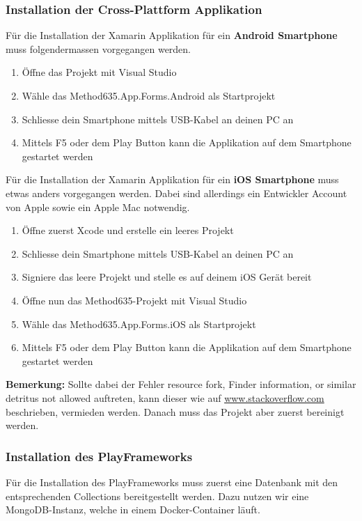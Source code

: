 \subsubsection*{Installation der Cross-Plattform Applikation}
\label{subsub:installation}
Für die Installation der Xamarin Applikation für ein \textbf{Android Smartphone} muss folgendermassen vorgegangen werden.

\begin{enumerate}
  \item Öffne das Projekt mit Visual Studio
  \item Wähle das \grqq Method635.App.Forms.Android \grqq als Startprojekt
  \item Schliesse dein Smartphone mittels USB-Kabel an deinen PC an
  \item Mittels F5 oder dem Play Button kann die Applikation auf dem Smartphone gestartet werden
\end{enumerate}
Für die Installation der Xamarin Applikation für ein \textbf{iOS Smartphone} muss etwas anders vorgegangen werden. Dabei sind allerdings ein Entwickler Account von Apple sowie ein Apple Mac notwendig.

\begin{enumerate}
  \item Öffne zuerst Xcode und erstelle ein leeres Projekt
  \item Schliesse dein Smartphone mittels USB-Kabel an deinen PC an
  \item Signiere das leere Projekt und stelle es auf deinem iOS Gerät bereit
  \item Öffne nun das Method635-Projekt mit Visual Studio
  \item Wähle das \grqq Method635.App.Forms.iOS \grqq als Startprojekt
  \item Mittels F5 oder dem Play Button kann die Applikation auf dem Smartphone gestartet werden
\end{enumerate}
\textbf{Bemerkung:} Sollte dabei der Fehler \grqq resource fork, Finder information, or similar detritus not allowed\grqq{} auftreten, kann dieser wie auf \href{https://stackoverflow.com/questions/39652867/code-sign-error-in-macos-high-sierra-xcode-resource-fork-finder-information}{www.stackoverflow.com} beschrieben, vermieden werden. Danach muss das Projekt aber zuerst bereinigt werden.


\subsubsection*{Installation des PlayFrameworks}
Für die Installation des PlayFrameworks muss zuerst eine Datenbank mit den entsprechenden Collections bereitgestellt werden. Dazu nutzen wir eine MongoDB-Instanz, welche in einem Docker-Container läuft.


